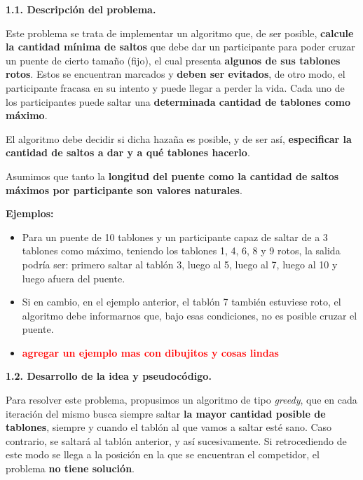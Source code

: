 \noindent
\textbf{1.1. Descripción del problema.}

\vspace*{0.3cm}

Este problema se trata de implementar un algoritmo que, de ser posible,
\textbf{calcule la cantidad mínima de saltos} que debe dar un participante para poder cruzar un
puente de cierto tamaño (fijo), el cual presenta \textbf{algunos de sus tablones rotos}. Estos se encuentran
marcados y \textbf{deben ser evitados}, de otro modo, el participante fracasa en su intento y puede llegar a
perder la vida. Cada uno de los participantes puede saltar una \textbf{determinada cantidad de tablones como máximo}. \medskip

El algoritmo debe decidir si dicha hazaña es posible, y de ser así,
\textbf{especificar la cantidad de saltos a dar y a qué tablones hacerlo}. \medskip

Asumimos que tanto la \textbf{longitud del puente como la cantidad de saltos máximos por participante
son valores naturales}.

\vspace*{0.5cm}

\textbf{Ejemplos:}
\begin{itemize}
  \item Para un puente de 10 tablones y un participante capaz de saltar de a 3
  tablones como máximo, teniendo los tablones 1, 4, 6, 8 y 9 rotos, la salida podría ser:
  primero saltar al tablón 3, luego al 5, luego al 7, luego al 10 y luego afuera del puente.
  \item Si en cambio, en el ejemplo anterior, el tablón 7 también estuviese roto,
  el algoritmo debe informarnos que, bajo esas condiciones, no es posible cruzar el puente.
  \item \textcolor{red}{\textbf{agregar un ejemplo mas con dibujitos y cosas lindas}}
\end{itemize}


\vspace*{0.75cm} \noindent



\noindent
\textbf{1.2. Desarrollo de la idea y pseudocódigo.}

\vspace*{0.3cm}

Para resolver este problema, propusimos un algoritmo de tipo \textit{greedy}, que en cada iteración
del mismo busca siempre saltar \textbf{la mayor cantidad posible de tablones}, siempre y cuando el
tablón al que vamos a saltar esté sano. Caso contrario, se saltará al tablón anterior, y así sucesivamente.
Si retrocediendo de este modo se llega a la posición en la que se encuentran el competidor, el problema
\textbf{no tiene solución}.

